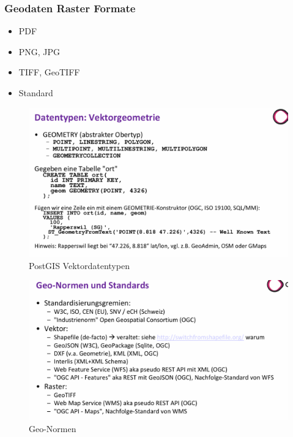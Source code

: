 \documentclass[../Main.tex]{subfiles}
\begin{document}
\subsubsection{Geodaten Raster Formate}
\begin{itemize}
    \item PDF
    \item PNG, JPG
    \item TIFF, GeoTIFF
        \item Standard
\end{itemize}

\begin{figure}[H]
    \centering
    \includegraphics[width=1\linewidth]{Images/postgis-vektordatentypen.png}
    \caption{PostGIS Vektordatentypen}
\end{figure}

\begin{figure}[H]
    \centering
    \includegraphics[width=0.75\linewidth]{Images/geonormen.png}
    \caption{Geo-Normen}
\end{figure}
\end{document}
